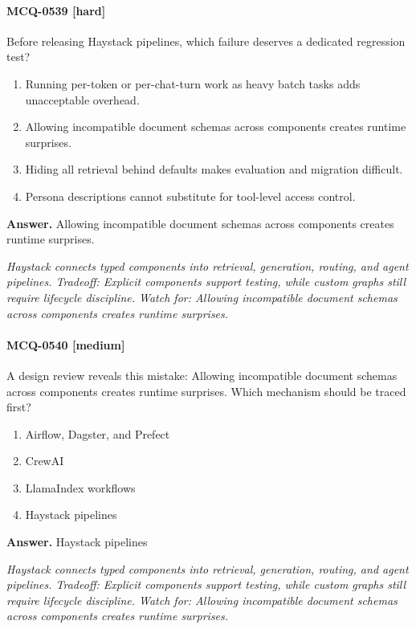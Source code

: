 \paragraph{MCQ-0539 [hard]} Before releasing Haystack pipelines, which failure deserves a dedicated regression test?
\begin{enumerate}[label=\Alph*.]
\item Running per-token or per-chat-turn work as heavy batch tasks adds unacceptable overhead.
\item Allowing incompatible document schemas across components creates runtime surprises.
\item Hiding all retrieval behind defaults makes evaluation and migration difficult.
\item Persona descriptions cannot substitute for tool-level access control.
\end{enumerate}
\noindent\textbf{Answer.} Allowing incompatible document schemas across components creates runtime surprises.
\par\textit{Haystack connects typed components into retrieval, generation, routing, and agent pipelines. Tradeoff: Explicit components support testing, while custom graphs still require lifecycle discipline. Watch for: Allowing incompatible document schemas across components creates runtime surprises.}
\paragraph{MCQ-0540 [medium]} A design review reveals this mistake: Allowing incompatible document schemas across components creates runtime surprises. Which mechanism should be traced first?
\begin{enumerate}[label=\Alph*.]
\item Airflow, Dagster, and Prefect
\item CrewAI
\item LlamaIndex workflows
\item Haystack pipelines
\end{enumerate}
\noindent\textbf{Answer.} Haystack pipelines
\par\textit{Haystack connects typed components into retrieval, generation, routing, and agent pipelines. Tradeoff: Explicit components support testing, while custom graphs still require lifecycle discipline. Watch for: Allowing incompatible document schemas across components creates runtime surprises.}
